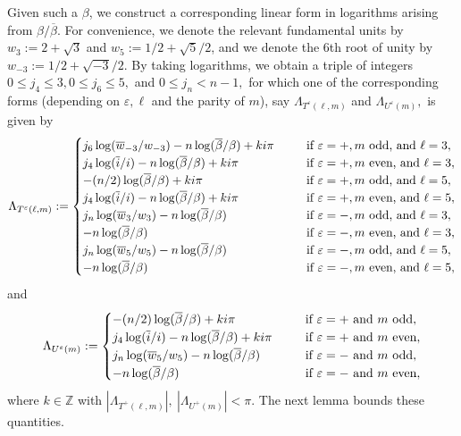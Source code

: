 \documentclass[12pt]{amsart}
\newcommand{\?}{\color{red}?}
\numberwithin{equation}{section}
\begin{document}
Given such a $\beta$, we construct a corresponding linear form in logarithms arising from $\beta/\overline{\beta}.$ 
For convenience, we denote the relevant fundamental units by
$w_{3}:=2+\sqrt{3}$ and $w_{5}:=1/2+\sqrt{5}/2$, and we denote the 6th root of unity by $w_{-3}:=1/2+\sqrt{-3}/2.$
By taking logarithms,  we obtain a triple of integers $0\leq j_4\leq 3, 0\leq j_6\leq 5,$ and $0\leq j_n<n-1,$ for which one of the
corresponding forms (depending on $\varepsilon, \ell$ and the parity of $m$), say
$\Lambda_{T^{\varepsilon}(\ell,m)}$ and  $\Lambda_{U^{\varepsilon}(m)},$ is given by
\begin{equation}
\Lambda_{T^{\varepsilon}(\ell,m)}:= \begin{cases} j_6\log({\overline{w}_{-3}}/ w_{-3})-n\log({\overline{\beta}}/\beta)+ki\pi \ \ \ \ \ &{\text {\rm if $\varepsilon=+, m$ odd, and $\ell=3$}},\\
j_4\log({\overline{i}}/ i)-n\log({\overline{\beta}}/\beta)+ki\pi \ \ \ \ \ &{\text {\rm if $\varepsilon=+, m$ even, and $\ell=3$}},\\
-(n/2)\log({\overline{\beta}}/\beta)+ki\pi \ \ \ \ \ &{\text {\rm if $\varepsilon=+, m$ odd, and $\ell=5$}},\\
j_4\log({\overline{i}}/ i)-n\log({\overline{\beta}}/\beta)+ki\pi \ \ \ \ \ &{\text {\rm if $\varepsilon=+, m$ even, and $\ell=5$}},\\
j_n\log(\overline{w}_{3}/w_{3})-n\log({\overline{\beta}}/\beta) \ \ \ \ \ &{\text {\rm if $\varepsilon=-, m$ odd, and $\ell=3$}},\\
-n\log(\overline{\beta}/\beta) \ \ \ \ \ &{\text {\rm if $\varepsilon=-, m$ even, and $\ell=3$}},\\
j_n\log(\overline{w}_{5}/w_{5})-n\log({\overline{\beta}}/\beta)  \ \ \ \ \ &{\text {\rm if $\varepsilon=-, m$ odd, and $\ell=5$}},\\
-n\log(\overline{\beta}/\beta) \ \ \ \ \ &{\text {\rm if $\varepsilon=-, m$ even, and $\ell=5$}},\\
\end{cases}
                    \end{equation}     
and
                      \begin{equation}
\Lambda_{U^{\varepsilon}(m)}:= \begin{cases}  -(n/2)\log({\overline{\beta}}/\beta)+ki\pi \ \ \ \ \ &{\text {\rm if $\varepsilon=+$ and $m$ odd}},\\
j_4\log({\overline{i}}/ i)-n\log({\overline{\beta}}/\beta)+ki\pi \ \ \ \ \ &{\text {\rm if $\varepsilon=+$ and $m$ even}},\\
j_n\log(\overline{w}_{5}/w_{5})-n\log({\overline{\beta}}/\beta) \ \ \ \ \ &{\text {\rm if $\varepsilon=-$ and $m$ odd}},\\
-n\log(\overline{\beta}/\beta) \ \ \ \ \ &{\text {\rm if $\varepsilon=-$ and $m$ even}},
                 \end{cases}
\end{equation}          
where $k\in\mathbb{Z}$ with $
|\Lambda_{T^{+}(\ell,m)}|,~|\Lambda_{U^{+}(m)}|<\pi$. %
The next lemma bounds these quantities.
\end{document}
